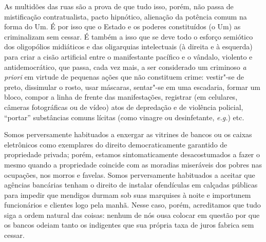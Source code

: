 As multidões das ruas são a prova de que tudo isso, porém, não passa de
mistificação contratualista, pacto hipnótico, alienação da potência
comum na forma do Um. É por isso que o Estado e os poderes constituídos
(o Um) as criminalizam sem cessar. É também a isso que se deve todo o
esforço semiótico dos oligopólios midiáticos e das oligarquias
intelectuais (à direita e à esquerda) para criar a cisão artificial
entre o manifestante pacífico e o vândalo, violento e antidemocrático,
que passa, cada vez mais, a ser considerado um criminoso \emph{a priori}
em virtude de pequenas ações que não constituem crime: vestir"-se de
preto, dissimular o rosto, usar máscaras, sentar"-se em uma escadaria,
formar um bloco, compor a linha de frente das manifestações, registrar
(em celulares, câmeras fotográficas ou de vídeo) atos de depredação e de
violência policial, ``portar'' substâncias comuns lícitas (como vinagre
ou desinfetante, \emph{e.g.}) etc.

Somos perversamente habituados a enxergar as vitrines de bancos ou os
caixas eletrônicos como exemplares do direito democraticamente garantido
de propriedade privada; porém, estamos sintomaticamente desacostumados a
fazer o mesmo quando a propriedade coincide com as moradias miseráveis
dos pobres nas ocupações, nos morros e favelas. Somos perversamente
habituados a aceitar que agências bancárias tenham o direito de instalar
ofendículas em calçadas públicas para impedir que mendigos durmam sob
suas marquises à noite e importunem funcionários e clientes logo pela
manhã. Nesse caso, porém, acreditamos que tudo siga a ordem natural das
coisas: nenhum de nós ousa colocar em questão por que os bancos odeiam
tanto os indigentes que sua própria taxa de juros fabrica sem cessar.

